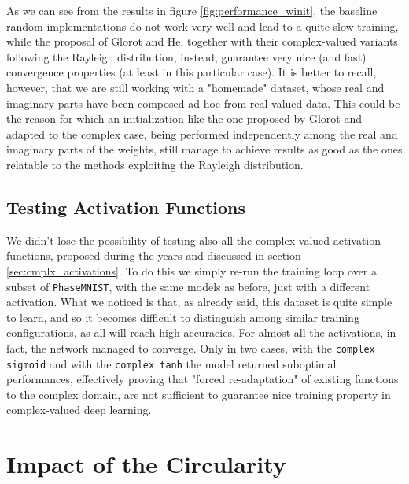 \documentclass[../main.tex]{subfiles}
\begin{document}
As we can see from the results in figure \ref{fig:performance_winit}, the baseline random implementations do not work very well and lead to a quite slow training, while the proposal of Glorot and He, together with their complex-valued variants following the Rayleigh distribution, instead, guarantee very nice (and fast) convergence properties (at least in this particular case). It is better to recall, however, that we are still working with a "homemade" dataset, whose real and imaginary parts have been composed ad-hoc from real-valued data. This could be the reason for which an initialization like the one proposed by Glorot and adapted to the complex case, being performed independently among the real and imaginary parts of the weights, still manage to achieve results as good as the ones relatable to the methods exploiting the Rayleigh distribution.


\subsection*{Testing Activation Functions}

We didn't lose the possibility of testing also all the complex-valued activation functions, proposed during the years and discussed in section \ref{sec:cmplx_activations}. To do this we simply re-run the training loop over a subset of \texttt{PhaseMNIST}, with the same models as before, just with a different activation. What we noticed is that, as already said, this dataset is quite simple to learn, and so it becomes difficult to distinguish among similar training configurations, as all will reach high accuracies. For almost all the activations, in fact, the network managed to converge. Only in two cases, with the \texttt{complex sigmoid} and with the \texttt{complex tanh} the model returned suboptimal performances, effectively proving that "forced re-adaptation" of existing functions to the complex domain, are not sufficient to guarantee nice training property in complex-valued deep learning.


\section{Impact of the Circularity}
\label{sec:impact_circularity}
\end{document}

